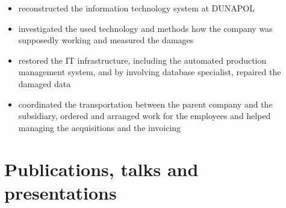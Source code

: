 \documentclass[10pt,a4paper,sans]{moderncv}        %
\begin{document}
\begin{itemize}
\item reconstructed the information technology system at DUNAPOL
\item investigated the used technology and methods how the company was supposedly working and measured the damages
\item restored the IT infrastructure, including the automated production management system, and by involving database specialist, repaired the damaged data
\item coordinated the transportation between the parent company and the subsidiary, ordered and arranged work for the employees and helped managing the acquisitions and the invoicing
\end{itemize}
\vspace{3pt}

\section{Publications, talks and presentations}
\end{document}

